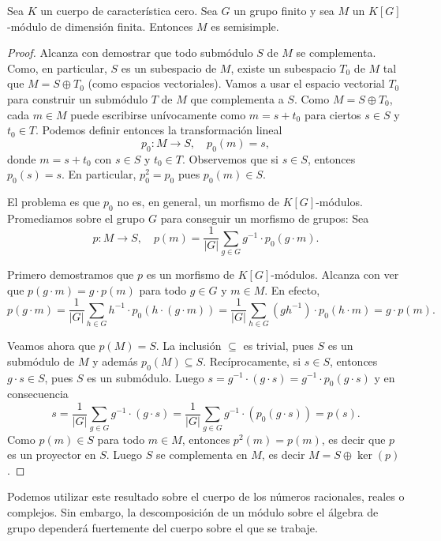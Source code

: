 %
\begin{theorem}[Maschke]
Sea $K$ un cuerpo de característica cero. 
Sea $G$ un grupo finito y sea $M$ un $K[G]$-módulo de dimensión finita. Entonces
$M$ es semisimple.
\end{theorem}

\begin{proof}
Alcanza con demostrar que todo submódulo $S$ de $M$ se complementa. 
Como, en particular, $S$ es un subespacio de $M$, existe un subespacio $T_0$ de $M$ 
tal que $M=S\oplus T_0$ (como espacios vectoriales). Vamos a usar el espacio vectorial
$T_0$ para construir un submódulo $T$ de $M$ que complementa a $S$. Como $M=S\oplus T_0$, 
cada $m\in M$ puede escribirse unívocamente como $m=s+t_0$ para ciertos $s\in S$ y $t_0\in T$. 
Podemos definir entonces la transformación lineal 
\[
p_0\colon M\to S,\quad
p_0(m)=s,
\]
donde $m=s+t_0$ con $s\in S$ y $t_0\in T$. 
Observemos que si $s\in S$, entonces $p_0(s)=s$. En particular, $p_0^2=p_0$ pues
$p_0(m)\in S$. 

El problema 
es que $p_0$ no es, en general, un morfismo de $K[G]$-módulos. Promediamos
sobre el grupo $G$ para conseguir un morfismo de grupos: Sea 
\[
p\colon M\to S,\quad
p(m)=\frac{1}{|G|}\sum_{g\in G}g^{-1}\cdot p_0(g\cdot m).
\]

Primero demostramos que $p$ es un morfismo de $K[G]$-módulos. Alcanza con ver que
$p(g\cdot m)=g\cdot p(m)$ para todo $g\in G$ y $m\in M$. En efecto,
\[
p(g\cdot m)=\frac{1}{|G|}\sum_{h\in G}h^{-1}\cdot p_0(h\cdot (g\cdot m))
=\frac{1}{|G|}\sum_{h\in G}(gh^{-1})\cdot p_0(h\cdot m)=g\cdot p(m).
\]

Veamos ahora que $p(M)=S$. La inclusión $\subseteq$ es trivial, pues $S$ es un submódulo de $M$ 
y además $p_0(M)\subseteq S$. Recíprocamente, si $s\in S$, entonces $g\cdot s\in S$, pues
$S$ es un submódulo. Luego 
$s=g^{-1}\cdot (g\cdot s)=g^{-1}\cdot p_0(g\cdot s)$ y en consecuencia
\[
s=\frac{1}{|G|}\sum_{g\in G}g^{-1}\cdot (g\cdot s)=\frac{1}{|G|}\sum_{g\in G}g^{-1}\cdot (p_0(g\cdot s))=p(s).
\]
Como $p(m)\in S$ para todo $m\in M$, entonces $p^2(m)=p(m)$, es decir que $p$ es un proyector en $S$. 
Luego $S$ se complementa en $M$, es decir $M=S\oplus\ker(p)$.
\end{proof} 

Podemos utilizar este resultado sobre el cuerpo de los números racionales, reales o complejos. Sin embargo, 
la descomposición de un módulo sobre el álgebra de grupo dependerá
fuertemente del cuerpo sobre el que se trabaje. 

